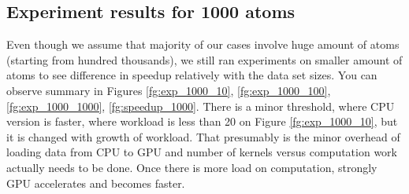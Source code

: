 \documentclass[12pt,letterpaper]{report}
\begin{document}
\subsection{Experiment results for 1000 atoms}

\hspace{3em} Even though we assume that majority of our cases involve huge amount of atoms (starting from hundred thousands), we still ran experiments on smaller amount of atoms to see difference in speedup relatively with the data set sizes. You can observe summary in Figures \ref{fg:exp_1000_10}, \ref{fg:exp_1000_100}, \ref{fg:exp_1000_1000}, \ref{fg:speedup_1000}. There is a minor threshold, where CPU version is faster, where workload is less than 20 on Figure \ref{fg:exp_1000_10}, but it is changed with growth of workload. That presumably is the minor overhead of loading data from CPU to GPU and number of kernels versus computation work actually needs to be done. Once there is more load on computation, strongly GPU accelerates and becomes faster.
\end{document}
